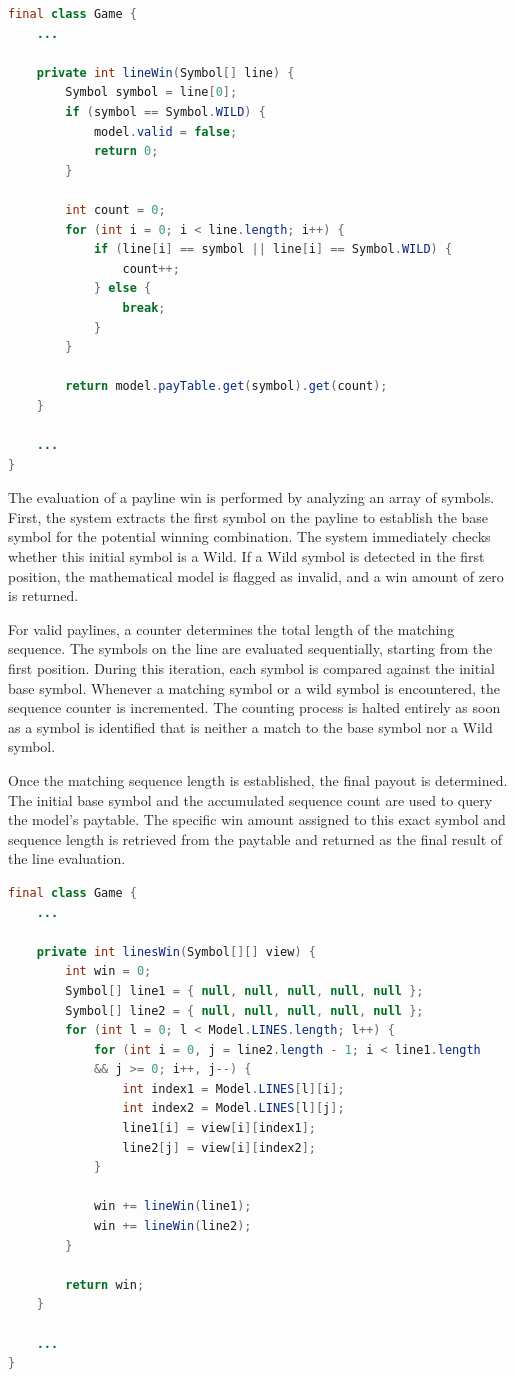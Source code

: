 \documentclass[12pt,twoside,openany]{book}
\begin{document}
\begin{lstlisting}[language=Java, caption={Single line prize checking}, label=listing-012]
final class Game {
	...

	private int lineWin(Symbol[] line) {
		Symbol symbol = line[0];
		if (symbol == Symbol.WILD) {
			model.valid = false;
			return 0;
		}

		int count = 0;
		for (int i = 0; i < line.length; i++) {
			if (line[i] == symbol || line[i] == Symbol.WILD) {
				count++;
			} else {
				break;
			}
		}

		return model.payTable.get(symbol).get(count);
	}

	...
}
\end{lstlisting}

The evaluation of a payline win is performed by analyzing an array of symbols. First, the system extracts the first symbol on the payline to establish the base symbol for the potential winning combination. The system immediately checks whether this initial symbol is a Wild. If a Wild symbol is detected in the first position, the mathematical model is flagged as invalid, and a win amount of zero is returned.

For valid paylines, a counter determines the total length of the matching sequence. The symbols on the line are evaluated sequentially, starting from the first position. During this iteration, each symbol is compared against the initial base symbol. Whenever a matching symbol or a wild symbol is encountered, the sequence counter is incremented. The counting process is halted entirely as soon as a symbol is identified that is neither a match to the base symbol nor a Wild symbol.

Once the matching sequence length is established, the final payout is determined. The initial base symbol and the accumulated sequence count are used to query the model's paytable. The specific win amount assigned to this exact symbol and sequence length is retrieved from the paytable and returned as the final result of the line evaluation.

\begin{lstlisting}[language=Java, caption={Checking of all possible lines}, label=listing-013]
final class Game {
	...

	private int linesWin(Symbol[][] view) {
		int win = 0;
		Symbol[] line1 = { null, null, null, null, null };
		Symbol[] line2 = { null, null, null, null, null };
		for (int l = 0; l < Model.LINES.length; l++) {
			for (int i = 0, j = line2.length - 1; i < line1.length 
			&& j >= 0; i++, j--) {
				int index1 = Model.LINES[l][i];
				int index2 = Model.LINES[l][j];
				line1[i] = view[i][index1];
				line2[j] = view[i][index2];
			}

			win += lineWin(line1);
			win += lineWin(line2);
		}

		return win;
	}

	...
}
\end{lstlisting}
\end{document}
